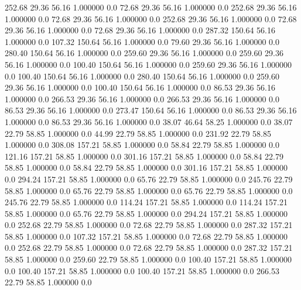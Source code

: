   252.68   29.36   56.16    1.000000    0.0
   72.68   29.36   56.16    1.000000    0.0
  252.68   29.36   56.16    1.000000    0.0
   72.68   29.36   56.16    1.000000    0.0
  252.68   29.36   56.16    1.000000    0.0
   72.68   29.36   56.16    1.000000    0.0
   72.68   29.36   56.16    1.000000    0.0
  287.32  150.64   56.16    1.000000    0.0
  107.32  150.64   56.16    1.000000    0.0
   79.60   29.36   56.16    1.000000    0.0
  280.40  150.64   56.16    1.000000    0.0
  259.60   29.36   56.16    1.000000    0.0
  259.60   29.36   56.16    1.000000    0.0
  100.40  150.64   56.16    1.000000    0.0
  259.60   29.36   56.16    1.000000    0.0
  100.40  150.64   56.16    1.000000    0.0
  280.40  150.64   56.16    1.000000    0.0
  259.60   29.36   56.16    1.000000    0.0
  100.40  150.64   56.16    1.000000    0.0
   86.53   29.36   56.16    1.000000    0.0
  266.53   29.36   56.16    1.000000    0.0
  266.53   29.36   56.16    1.000000    0.0
   86.53   29.36   56.16    1.000000    0.0
  273.47  150.64   56.16    1.000000    0.0
   86.53   29.36   56.16    1.000000    0.0
   86.53   29.36   56.16    1.000000    0.0
   38.07   46.64   58.25    1.000000    0.0
   38.07   22.79   58.85    1.000000    0.0
   44.99   22.79   58.85    1.000000    0.0
  231.92   22.79   58.85    1.000000    0.0
  308.08  157.21   58.85    1.000000    0.0
   58.84   22.79   58.85    1.000000    0.0
  121.16  157.21   58.85    1.000000    0.0
  301.16  157.21   58.85    1.000000    0.0
   58.84   22.79   58.85    1.000000    0.0
   58.84   22.79   58.85    1.000000    0.0
  301.16  157.21   58.85    1.000000    0.0
  294.24  157.21   58.85    1.000000    0.0
   65.76   22.79   58.85    1.000000    0.0
  245.76   22.79   58.85    1.000000    0.0
   65.76   22.79   58.85    1.000000    0.0
   65.76   22.79   58.85    1.000000    0.0
  245.76   22.79   58.85    1.000000    0.0
  114.24  157.21   58.85    1.000000    0.0
  114.24  157.21   58.85    1.000000    0.0
   65.76   22.79   58.85    1.000000    0.0
  294.24  157.21   58.85    1.000000    0.0
  252.68   22.79   58.85    1.000000    0.0
   72.68   22.79   58.85    1.000000    0.0
  287.32  157.21   58.85    1.000000    0.0
  107.32  157.21   58.85    1.000000    0.0
   72.68   22.79   58.85    1.000000    0.0
  252.68   22.79   58.85    1.000000    0.0
   72.68   22.79   58.85    1.000000    0.0
  287.32  157.21   58.85    1.000000    0.0
  259.60   22.79   58.85    1.000000    0.0
  100.40  157.21   58.85    1.000000    0.0
  100.40  157.21   58.85    1.000000    0.0
  100.40  157.21   58.85    1.000000    0.0
  266.53   22.79   58.85    1.000000    0.0
